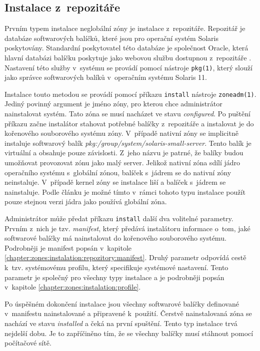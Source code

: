 \subsection{Instalace z~repozitáře}
\label{chapter:zones:instalation:repozitory}
Prvním typem instalace neglobální zóny je instalace z~repozitáře. Repozitář je databáze softwarových balíčků, které jsou pro 
operační systém Solaris poskytovány. Standardní poskytovatel této databáze je společnost Oracle, která hlavní databázi balíčku
poskytuje jako webovou službu dostupnou z~repozitáře \cite{oracle:solaris:desing:pkg_repository}. Nastavení této služby v~systému
se provádí pomocí nástroje \verb|pkg(1)|, který slouží jako správce softwarových balíků v~operačním systému Solaris 11.

Instalace touto metodou se provádí pomocí příkazu \verb|install| nástroje \verb|zoneadm(1)|. Jediný povinný argument je jméno
zóny, pro kterou chce administrátor nainstalovat systém. Tato zóna se musí nacházet ve stavu \textit{configured}. Po puštění 
příkazu začne instalátor stahovat potřebné balíčky z~repozitáře a instalovat je do kořenového souborového systému zóny. V~případě
nativní zóny se implicitně instaluje softwarový balík \textit{pkg:/group/system/solaris-small-server}. Tento balík je virtuální
a obsahuje pouze závislosti. Z~jeho názvu je patrné, že balíky budou umožňovat provozovat zónu jako malý server. Jelikož nativní
zóna sdílí jádro operačního systému s~globální zónou, balíček s~jádrem se do nativní zóny neinstaluje. V~případě kernel zóny
se instalace liší a balíček s~jádrem se nainstaluje. Podle článku \cite{oracle:solaris:zones:kernel_version} je možné tímto
v~rámci tohoto typu instalace použít pouze stejnou verzi jádra jako používá globální zóna.

Administrátor může předat příkazu \verb|install| další dva volitelné parametry. Prvním z~nich je tzv. \textit{manifest}, který
předává instalátoru informace o~tom, jaké softwarové balíčky má nainstalovat do kořenového souborového systému. Podrobněji 
je manifest popsán v~kapitole \ref{chapter:zones:instalation:repozitory:manifest}. Druhý parametr odpovídá cestě k~tzv. 
systémovému profilu, který specifikuje systémové nastavení. Tento parametr je společný pro všechny typy instalace a je podrobněji
popsán v~kapitole \ref{chapter:zones:instalation:profile}.

Po úspěšném dokončení instalace jsou všechny softwarové balíčky definované v~manifestu nainstalované a připravené k~použití.
Čerstvě nainstalovaná zóna se nachází ve stavu \textit{installed} a čeká na první spuštění. Tento typ instalace trvá nejdelší
dobu. Je to zapříčiněno tím, že se všechny balíčky musí stáhnout pomocí počítačové sítě.
